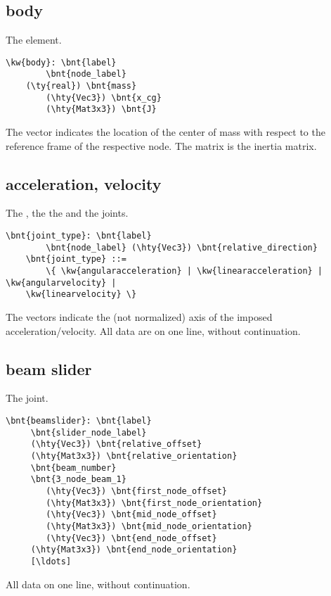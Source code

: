 \subsection{body}
The  element.
\begin{Verbatim}[commandchars=\\\{\}]
    \kw{body}: \bnt{label}
        \bnt{node_label} 
	(\ty{real}) \bnt{mass}
        (\hty{Vec3}) \bnt{x_cg}
        (\hty{Mat3x3}) \bnt{J}
\end{Verbatim}
The  vector indicates the location of the center of mass with respect to
the reference frame of the respective node. The  matrix is the inertia
matrix.

\subsection{acceleration, velocity}
The , the  
the  and the  joints.
\begin{Verbatim}[commandchars=\\\{\}]
    \bnt{joint_type}: \bnt{label}
        \bnt{node_label} (\hty{Vec3}) \bnt{relative_direction}
    \bnt{joint_type} ::=
    	\{ \kw{angularacceleration} | \kw{linearacceleration} | \kw{angularvelocity} |
	\kw{linearvelocity} \}
\end{Verbatim}
The  vectors indicate the (not normalized) axis of the imposed
acceleration/velocity.
All data are on one line, without continuation.

\subsection{beam slider}
The  joint.
\begin{Verbatim}[commandchars=\\\{\}]
    \bnt{beamslider}: \bnt{label}
   	 \bnt{slider_node_label}
	 (\hty{Vec3}) \bnt{relative_offset}
	 (\hty{Mat3x3}) \bnt{relative_orientation}
	 \bnt{beam_number}
	 \bnt{3_node_beam_1}
	 	(\hty{Vec3}) \bnt{first_node_offset}
	 	(\hty{Mat3x3}) \bnt{first_node_orientation}
	 	(\hty{Vec3}) \bnt{mid_node_offset}
	 	(\hty{Mat3x3}) \bnt{mid_node_orientation}
	 	(\hty{Vec3}) \bnt{end_node_offset}
	 (\hty{Mat3x3}) \bnt{end_node_orientation}
	 [\ldots]
\end{Verbatim}
All data on one line, without continuation.
